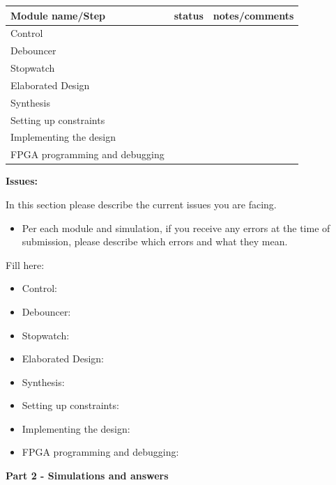 \documentclass[11pt,a4paper]{article}
\newcommand{\fillrow}{\rule[-0.9em]{0pt}{2.4em}}
\begin{document}
\vspace{0.5em}
\begin{tabularx}{\textwidth}{|p{3.8cm}|p{3cm}|X|}
\hline
Module name/Step & status & notes/comments \\ \hline
\fillrow Control                       & & \\ \hline
\fillrow Debouncer                     & & \\ \hline
\fillrow Stopwatch                     & & \\ \hline
\fillrow Elaborated Design             & & \\ \hline
\fillrow Synthesis                     & & \\ \hline
\fillrow Setting up constraints        & & \\ \hline
\fillrow Implementing the design       & & \\ \hline
\fillrow FPGA programming and debugging & & \\ \hline
\end{tabularx}

\vspace{1.5em}
\textbf{Issues:}

In this section please describe the current issues you are facing.
\begin{itemize}[noitemsep,topsep=2pt]
  \item Per each module and simulation, if you receive any errors at the time of submission, please describe which errors and what they mean.
\end{itemize}

Fill here:
\begin{itemize}[topsep=2pt]
  \item Control:
  \item Debouncer:
  \item Stopwatch:
  \item Elaborated Design:
  \item Synthesis:
  \item Setting up constraints:
  \item Implementing the design:
  \item FPGA programming and debugging:
\end{itemize}

\vspace{1.5em}

{\fontsize{14}{17}\selectfont \textbf{Part 2 - Simulations and answers}}
\end{document}
